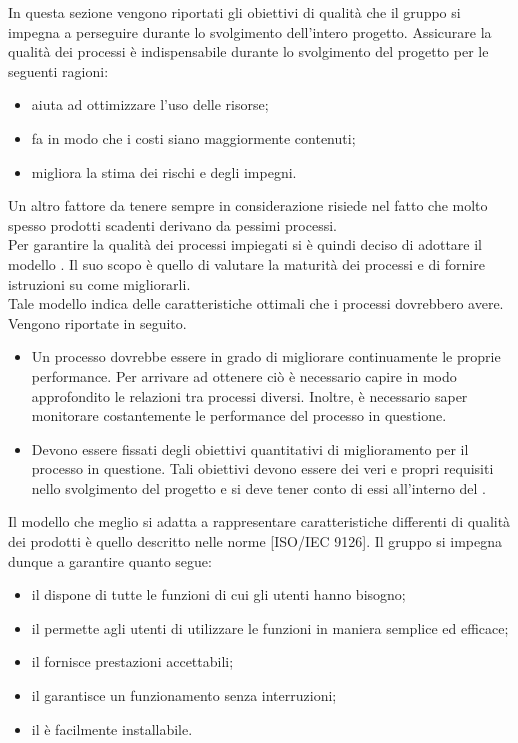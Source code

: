 
	In questa sezione vengono riportati gli obiettivi di qualità che il gruppo \groupname{} si impegna a perseguire durante lo svolgimento dell'intero 
	progetto.
	  \label{subsec:obiettiviprocesso}
		Assicurare la qualità dei processi è indispensabile durante lo svolgimento del progetto per le seguenti ragioni:
		\begin{itemize}
			\item aiuta ad ottimizzare l'uso delle risorse;
			\item fa in modo che i costi siano maggiormente contenuti;
			\item migliora la stima dei rischi e degli impegni.
		\end{itemize}
		Un altro fattore da tenere sempre in considerazione risiede nel fatto che molto spesso prodotti scadenti derivano da pessimi processi.\\
		Per garantire la qualità dei processi impiegati si è quindi deciso di adottare il modello . Il suo scopo è quello di valutare la maturità dei processi e di fornire istruzioni su come migliorarli.\\
		Tale modello indica delle caratteristiche ottimali che i processi dovrebbero avere. Vengono riportate in seguito.
		\begin{itemize}
			\item Un processo dovrebbe essere in grado di migliorare continuamente le proprie performance. Per arrivare ad ottenere ciò è necessario capire in modo approfondito le relazioni tra processi diversi. Inoltre, è necessario saper monitorare costantemente le performance del processo in questione.
			\item Devono essere fissati degli obiettivi quantitativi di miglioramento per il processo in questione. Tali obiettivi devono essere dei veri e propri requisiti nello svolgimento del progetto e si deve tener conto di essi all'interno del .
		\end{itemize}
	  \label{subsec:obiettiviprodotto}
		Il modello che meglio si adatta a rappresentare caratteristiche differenti di qualità dei prodotti  è quello descritto nelle norme [ISO/IEC 9126]. Il gruppo \groupname{} si impegna dunque a garantire quanto segue:
		\begin{itemize}
			\item il  dispone di tutte le funzioni di cui gli utenti hanno bisogno;
			\item il  permette agli utenti di utilizzare le funzioni in maniera semplice ed efficace;
			\item il  fornisce prestazioni accettabili;
			\item il  garantisce un funzionamento senza interruzioni;
			\item il  è facilmente installabile.
		\end{itemize}
